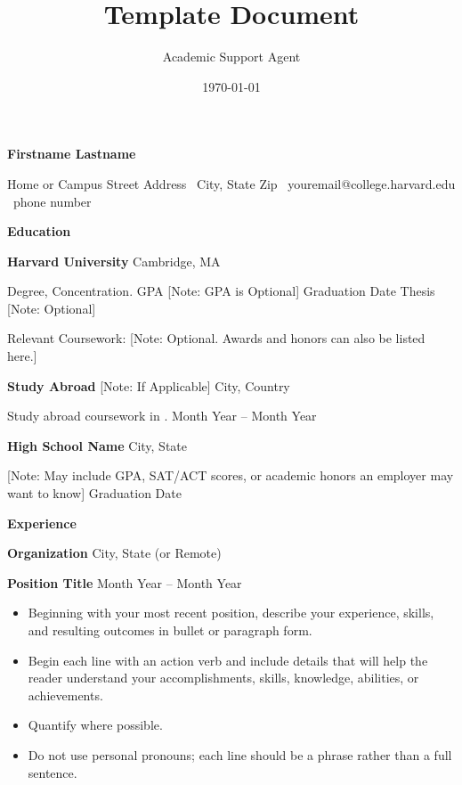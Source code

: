 \documentclass{article}
\title{Template Document}
\author{Academic Support Agent}
\date{\today}
\begin{document}
\maketitle

\begin{center}
    \textbf{Firstname Lastname}\\ 
    \hrulefill
\end{center}

\begin{center}
    Home or Campus Street Address \textbullet \ City, State Zip \textbullet \ youremail@college.harvard.edu \textbullet \ phone number
\end{center}

\vspace{0.5pt}

\begin{center}
    \textbf{Education}
\end{center}
\textbf{Harvard University} \hfill Cambridge, MA

Degree, Concentration. GPA [Note: GPA is Optional] \hfill Graduation Date Thesis [Note: Optional]

Relevant Coursework: [Note: Optional. Awards and honors can also be listed here.]

\vspace{12pt}

\textbf{Study Abroad} [Note: If Applicable] \hfill City, Country

Study abroad coursework in   . \hfill	Month Year -- Month Year

\vspace{12pt}

\textbf{High School Name} \hfill	City, State

[Note: May include GPA, SAT/ACT scores, or academic honors an employer may want to know] \hfill Graduation Date

\vspace{12pt}

\begin{center}
    \textbf{Experience}
\end{center}
\textbf{Organization} \hfill City, State (or Remote)

\textbf{Position Title} \hfill Month Year -- Month Year
\begin{itemize}[noitemsep, topsep=0pt, partopsep=0pt, parsep=0pt]
    \item Beginning with your most recent position, describe your experience, skills, and resulting outcomes in bullet or paragraph form.
    \item Begin each line with an action verb and include details that will help the reader understand your accomplishments, skills, knowledge, abilities, or achievements.
    \item Quantify where possible.
    \item Do not use personal pronouns; each line should be a phrase rather than a full sentence.
\end{itemize}
\end{document}
